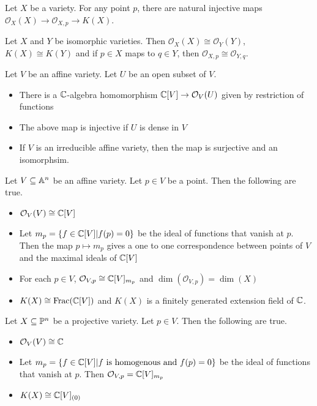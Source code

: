 \documentclass[a4paper]{article}
\begin{document}
\begin{lmm}{}{} Let $X$ be a variety. For any point $p$, there are natural injective maps $\mathcal{O}_X(X)\to\mathcal{O}_{X,p}\to K(X)$. 
\end{lmm}

\begin{prp}{}{} Let $X$ and $Y$ be isomorphic varieties. Then $\mathcal{O}_X(X)\cong\mathcal{O}_Y(Y)$, $K(X)\cong K(Y)$ and if $p\in X$ maps to $q\in Y$, then $\mathcal{O}_{X,p}\cong\mathcal{O}_{Y,q}$. 
\end{prp}

\begin{thm}{}{} Let $V$ be an affine variety. Let $U$ be an open subset of $V$. 
\begin{itemize}
\item There is a $\mathbb{C}$-algebra homomorphism $\mathbb{C}[V]\to\mathcal{O}_V(U)$ given by restriction of functions
\item The above map is injective if $U$ is dense in $V$
\item If $V$ is an irreducible affine variety, then the map is surjective and an isomorphsim. 
\end{itemize}
\end{thm}

\begin{thm}{}{} Let $V\subseteq\mathbb{A}^n$ be an affine variety. Let $p\in V$ be a point. Then the following are true. 
\begin{itemize}
\item $\mathcal{O}_V(V)\cong\mathbb{C}[V]$
\item Let $m_p=\{f\in\mathbb{C}[V]|f(p)=0\}$ be the ideal of functions that vanish at $p$. Then the map $p\mapsto m_p$ gives a one to one correspondence between points of $V$ and the maximal ideals of $\mathbb{C}[V]$
\item For each $p\in V$, $\mathcal{O}_{V,p}\cong\mathbb{C}[V]_{m_p}$ and $\dim(\mathcal{O}_{V,p})=\dim(X)$
\item $K(X)\cong\text{Frac}(\mathbb{C}[V])$ and $K(X)$ is a finitely generated extension field of $\mathbb{C}$. 
\end{itemize}
\end{thm}

\begin{thm}{}{} Let $X\subseteq\mathbb{P}^n$ be a projective variety. Let $p\in V$. Then the following are true. 
\begin{itemize}
\item $\mathcal{O}_V(V)\cong\mathbb{C}$
\item Let $m_p=\{f\in\mathbb{C}[V]|f\text{ is homogenous and }f(p)=0\}$ be the ideal of functions that vanish at $p$. Then $\mathcal{O}_{V,p}=\mathbb{C}[V]_{m_p}$
\item $K(X)\cong\mathbb{C}[V]_{(0)}$
\end{itemize}
\end{thm}
\end{document}
